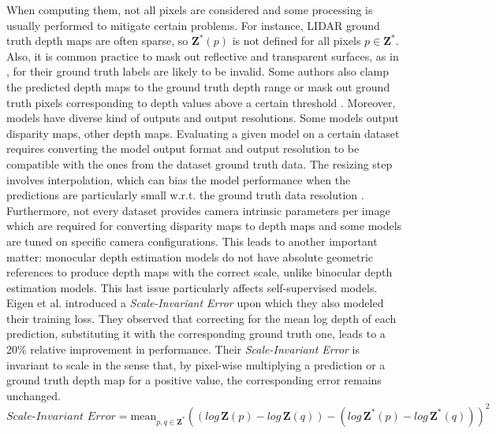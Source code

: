 When computing them, not all pixels are considered and some processing is usually performed to mitigate certain problems.
For instance, LIDAR ground truth depth maps are often sparse, so $\mathbf{Z}^{*}(p)$ is not defined for all pixels $p \in \mathbf{Z}^{*}$.
Also, it is common practice to mask out reflective and transparent surfaces, as in \cite{Eigen}, for their ground truth labels are likely to be invalid.
Some authors also clamp the predicted depth maps \cite{Garg} to the ground truth depth range or mask out ground truth pixels corresponding to depth values above a certain threshold \cite{evalStudy}.
Moreover, models have diverse kind of outputs and output resolutions.
Some models output disparity maps, other depth maps.
Evaluating a given model on a certain dataset requires converting the model output format and output resolution to be compatible with the ones from the dataset ground truth data.
The resizing step involves interpolation, which can bias the model performance when the predictions are particularly small w.r.t. the ground truth data resolution \cite{evalStudy}.
Furthermore, not every dataset provides camera intrinsic parameters per image which are required for converting disparity maps to depth maps and some models are tuned on specific camera configurations.
This leads to another important matter: monocular depth estimation models do not have absolute geometric references to produce depth maps with the correct scale, unlike binocular depth estimation models.
This last issue particularly affects self-supervised models.
Eigen et al. \cite{Eigen} introduced a \textit{Scale-Invariant Error} upon which they also modeled their training loss.
They observed that correcting for the mean log depth of each prediction, substituting it with the corresponding ground truth one, leads to a 20\% relative improvement in performance.
Their \textit{Scale-Invariant Error} is invariant to scale in the sense that, by pixel-wise multiplying a prediction or a ground truth depth map for a positive value, the corresponding error remains unchanged.
\[
	\textit{Scale-Invariant Error} =
		\text{mean}_{p, q \in \mathbf{Z}^{*}}
		(
			( log \, \mathbf{Z}(p) - log \, \mathbf{Z}(q)) -
			( log \, \mathbf{Z}^{*}(p) - log \, \mathbf{Z}^{*}(q))
		)^{2}
\]

